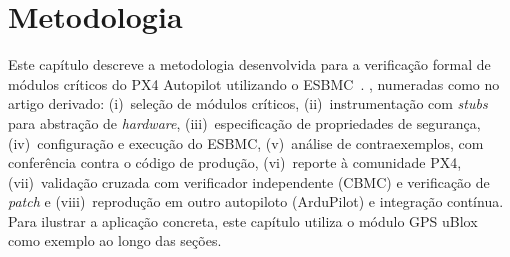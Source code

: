 
\chapter{Metodologia}
\label{cap:metodologia}



Este capítulo descreve a metodologia desenvolvida para a
verificação formal de módulos críticos do PX4 Autopilot utilizando o
ESBMC~\cite{Menezes2024}. , numeradas como no artigo derivado: (i)~seleção de módulos
críticos, (ii)~instrumentação com \textit{stubs} para abstração de
\textit{hardware}, (iii)~especificação de propriedades de segurança,
(iv)~configuração e execução do ESBMC, (v)~análise de contraexemplos, com
conferência contra o código de produção, (vi)~reporte à comunidade PX4,
(vii)~validação cruzada com verificador independente (CBMC) e verificação de
\textit{patch} e (viii)~reprodução em outro autopiloto (ArduPilot) e integração
contínua.
Para ilustrar a aplicação concreta, este capítulo utiliza o
módulo GPS uBlox como exemplo ao longo das seções.

